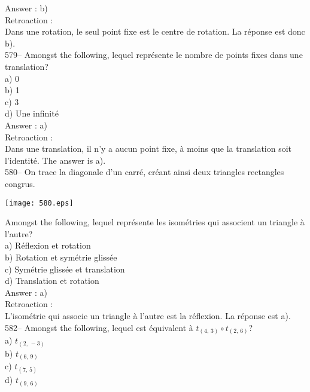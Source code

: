 ﻿\documentclass[letterpaper, 12pt]{article}
\begin{document}
Answer : b)\\

Retroaction : \\
Dans une rotation, le seul point fixe est le centre de rotation.  La
r\'eponse est donc b).\\

579-- Amongst the following, lequel repr\'esente le nombre de
points fixes dans une translation?\\
a) 0 \\
b) 1\\
c) 3\\
d) Une infinit\'e\\

Answer : a)\\

Retroaction : \\
Dans une translation, il n'y a aucun point fixe, \`a moins que la
translation soit l'identit\'e.  The answer is a).\\

580-- On trace la diagonale d'un carr\'e, cr\'eant ainsi deux
triangles rectangles congrus.\\
\begin{center}
    \texttt{[image: 580.eps]}
    \end{center}
Amongst the following, lequel repr\'esente
les isom\'etries qui associent un triangle \`a l'autre?\\
a) R\'eflexion et rotation\\
b) Rotation et sym\'etrie gliss\'ee\\
c) Sym\'etrie gliss\'ee et translation\\
d) Translation et rotation\\

Answer : a) \\

Retroaction : \\
L'isom\'etrie qui associe un triangle \`a l'autre est la r\'eflexion.  La
r\'eponse est a).\\


582-- Amongst the following, lequel est \'equivalent \`a
$t_{\left(4,\,3\right)} \circ t_{\left(2,\,6\right) }$?\\
a) $t_{\left(2,\,-3\right) }$\\
b) $t_{\left(6,\,9\right) }$\\
c) $t_{\left(7,\,5\right) }$\\
d) $t_{\left(9,\,6\right) }$\\
\end{document}
